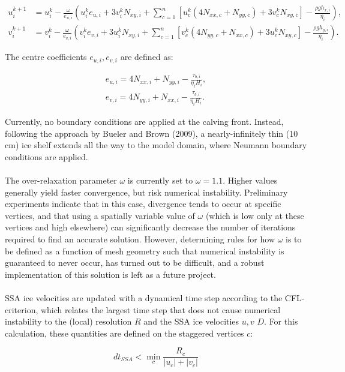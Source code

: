 \documentclass{article}
\begin{document}
\begin{align}
u_i^{k+1} &= u_i^k - \frac{\omega}{e_{u,i}} \left( u_i^k e_{u,i} + 3 v_i^k N_{xy,i} +
\sum_{c=1}^n \left[ u_c^k \left( 4 N_{xx,c} + N_{yy,c} \right) + 3 v_c^k N_{xy,c} \right] - \frac{\rho g h_{x,i}}{\overline{\eta_i}} \right), \\
v_i^{k+1} &= v_i^k - \frac{\omega}{e_{v,i}} \left( v_i^k e_{v,i} + 3 u_i^k N_{xy,i} +
\sum_{c=1}^n \left[ v_c^k \left( 4 N_{yy,c} + N_{xx,c} \right) + 3 u_c^k N_{xy,c} \right] - \frac{\rho g h_{y,i}}{\overline{\eta_i}} \right).
\end{align}

The centre coefficients $e_{u,i}, e_{v,i}$ are defined as:

\begin{align}
e_{u,i} = 4 N_{xx,i} + N_{yy,i} - \frac{\tau_{b,i}}{\overline{\eta_i} H_i}, \\
e_{v,i} = 4 N_{yy,i} + N_{xx,i} - \frac{\tau_{b,i}}{\overline{\eta_i} H_i}.
\end{align}

Currently, no boundary conditions are applied at the calving front. Instead, following the approach by Bueler and Brown (2009), a nearly-infinitely thin (10 cm) ice shelf extends all the way to the model domain, where Neumann boundary conditions are applied. \\
\\
The over-relaxation parameter $\omega$ is currently set to $\omega = 1.1$. Higher values generally yield faster convergence, but risk numerical instability. Preliminary experiments indicate that in this case, divergence tends to occur at specific vertices, and that using a spatially variable value of $\omega$ (which is low only at these vertices and high elsewhere) can significantly decrease the number of iterations required to find an accurate solution. However, determining rules for how $\omega$ is to be defined as a function of mesh geometry such that numerical instability is guaranteed to never occur, has turned out to be difficult, and a robust implementation of this solution is left as a future project.\\
\\
SSA ice velocities are updated with a dynamical time step according to the CFL-criterion, which relates the largest time step that does not cause numerical instability to the (local) resolution $R$ and the SSA ice velocities $u,v$ $D$. For this calculation, these quantities are defined on the staggered vertices $c$:

\begin{equation} \label{eq:SSA_dt}
dt_{SSA} < \min_c \frac{R_c}{|u_c| + |v_c|}
\end{equation}
\end{document}
